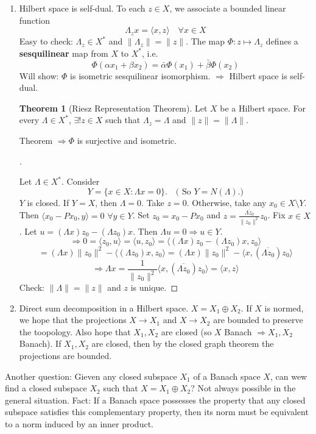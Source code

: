 \documentclass{article}
\theoremstyle{definition}
\newtheorem{thm}{Theorem}
\newenvironment{proofs}[1][\proofname]{%
  \begin{proof}[#1]$ $\par\nobreak\ignorespaces
}{%
  \end{proof}
}
\begin{document}
\begin{enumerate}
	\item Hilbert space is self-dual.
		To each $z \in X$, we associate a bounded linear function 
		\[
			\Lambda_z x = \langle x, z \rangle \quad \forall x \in X
		\]
		Easy to check: $\Lambda_z \in X^*$ and $\|\Lambda_z\| = \|z\|$.
		The map $\Phi: z \mapsto \Lambda_z$ defines a \textbf{sesquilinear} map from $X$ to $X^*$, i.e.
		\[
			\Phi(\alpha x_1 + \beta x_2) = \bar{\alpha} \Phi(x_1) + \bar{\beta} \Phi(x_2)
		\]
		Will show: $\Phi$ is isometric sesquilinear isomorphism.
		$\Rightarrow$ Hilbert space is self-dual.
		\begin{thm}[Riesz Representation Theorem]
			Let $X$ be a Hilbert space.
			For every $\Lambda \in X^*$, $\exists ! z \in X$ such that $\Lambda_z = \Lambda$ and $\|z\| = \|\Lambda\|$.
		\end{thm}
		Theorem $\Rightarrow \Phi$ is surjective and isometric.
		\begin{proofs}
			Let $\Lambda \in X^*$.
			Consider 
			\[
				Y = \{ x \in X: \Lambda x = 0\}. \quad \text{( So } Y = N(\Lambda) \text{.)}
			\]
			$Y$ is closed.
			If $Y = X$, then $\Lambda = 0$.
			Take $z = 0$.
			Otherwise, take any $x_0 \in X \setminus Y$.
			Then $\langle x_0 - P x_0, y \rangle = 0$ $\forall y \in Y$.
			Set $z_0 = x_0 - P x_0$ and $z = \frac{\overline{\Lambda z_0}}{\|z_0\|^2} z_0$.
			Fix $x \in X$.
			Let $u = (\Lambda x) z_0 - (\Lambda z_0) x$.
			Then $\Lambda u = 0 \Rightarrow u \in Y$.
			\[
				\Rightarrow 0 = \langle z_0, u \rangle = \langle u, z_0 \rangle = \langle (\Lambda x) z_0 - (\Lambda z_0) x, z_0 \rangle
			\]
			\[
				= (\Lambda x) \|z_0\|^2 - \langle(\Lambda z_0) x, z_0 \rangle = (\Lambda x) \|z_0\|^2 - \langle x, (\overline{\Lambda z_0}) z_0 \rangle
			\]
			\[
				\Rightarrow \Lambda x = \frac{1}{\|z_0\|^2} \langle x, (\overline{\Lambda z_0}) z_0 \rangle = \langle x, z \rangle
			\]
			Check: $\|\Lambda\| = \|z\|$ and $z$ is unique.
		\end{proofs}

	\item Direct sum decomposition in a Hilbert space.
		$X = X_1 \oplus X_2$.
		If $X$ is normed, we hope that the projections $X \to X_1$ and $X \to X_2$ are bounded to preserve the toopology.
		Also hope that $X_1, X_2$ are closed (so $X$ Banach $\Rightarrow X_1, X_2$ Banach).
		If $X_1, X_2$ are closed, then by the closed graph theorem the projections are bounded.
\end{enumerate}

Another question: Gieven any closed subspace $X_1$ of a Banach space $X$, can wew find a closed subspace $X_2$ such that $X = X_1 \oplus X_2$?
Not always possible in the general situation.
Fact: If a Banach space possesses the property that any closed subspace satisfies this complementary property, then its norm must be equivalent to a norm induced by an inner product.
\end{document}
